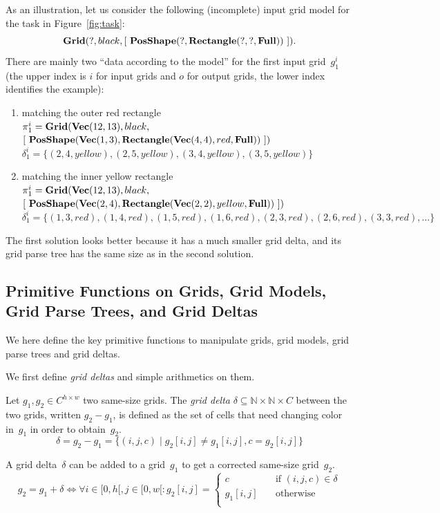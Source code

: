 \documentclass[a4paper]{llncs}
\newcommand{\nat}{\mathbb{N}}
\begin{document}
As an illustration, let us consider the following (incomplete) input
grid model for the task in Figure~\ref{fig:task}:
\[ {\bf Grid}(?, black, [\ {\bf PosShape}(?, {\bf Rectangle}(?,?,{\bf Full}))\ ]). \] There
are mainly two ``data according to the model'' for the first input
grid~$g^i_1$ (the upper index is $i$ for input grids and $o$ for
output grids, the lower index identifies the example):
\begin{enumerate}
\item matching the outer red rectangle\\
  $\pi^i_1 = {\bf Grid}({\bf Vec}(12,13), black,$\\
  \hspace*{2cm} $[\ {\bf PosShape}({\bf Vec}(1,3), {\bf Rectangle}({\bf Vec}(4,4), red, {\bf Full}))\ ])$\\
  $\delta^i_1 = \{ (2,4,yellow), (2,5,yellow), (3,4,yellow), (3,5,yellow) \}$

\item matching the inner yellow rectangle\\
  $\pi^i_1 = {\bf Grid}({\bf Vec}(12,13), black,$\\
  \hspace*{2cm} $[\ {\bf PosShape}({\bf Vec}(2,4), {\bf Rectangle}({\bf Vec}(2,2), yellow, {\bf Full}))\ ])$\\
  $\delta^i_1 = \{ (1,3,red), (1,4,red), (1,5,red), (1,6,red), (2,3,red), (2,6,red), (3,3,red), ...\}$
\end{enumerate}
The first solution looks better because it has a much smaller grid
delta, and its grid parse tree has the same size as in the second
solution.


\subsection{Primitive Functions on Grids, Grid Models, Grid Parse Trees, and Grid Deltas}
\label{primitive:functions}

We here define the key primitive functions to manipulate grids, grid
models, grid parse trees and grid deltas.

We first define {\em grid deltas} and simple arithmetics on them.

\begin{definition}
  Let $g_1, g_2 \in C^{h \times w}$ two same-size grids. The {\em grid
    delta} $\delta \subseteq \nat \times \nat \times C$ between the
  two grids, written $g_2 - g_1$, is defined as the set of cells that
  need changing color in~$g_1$ in order to obtain~$g_2$.
  \[ \delta = g_2 - g_1 = \{ (i,j,c) \mid g_2[i,j] \neq g_1[i,j], c = g_2[i,j] \} \]
  
  A grid delta~$\delta$ can be added to a grid~$g_1$ to get a corrected same-size grid~$g_2$.
  \[ g_2 = g_1 + \delta \iff \forall i \in [0,h[, j \in [0,w[: g_2[i,j] =
    \left\{
      \begin{array}{ll}
        c & \quad\textrm{if~} (i,j,c) \in \delta \\
        g_1[i,j] & \quad\textrm{otherwise} \\
      \end{array}\right. \]
\end{definition}
\end{document}
